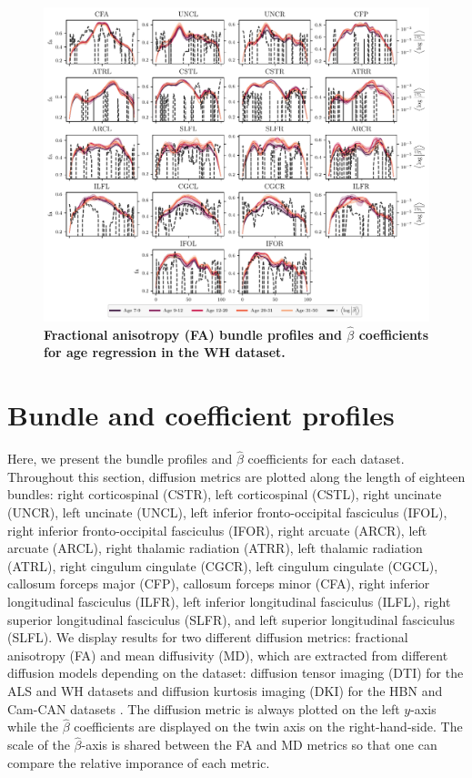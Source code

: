 \documentclass[10pt,%
               aps,%
               prl,%
               reprint,%
               superscriptaddress,%
               preprintnumbers,%
               linenumbers,%
               amsmath,%
               floatfix]{revtex4-2}
\begin{document}
\begin{figure}
    \includegraphics[width=\textwidth]{wh_coefs_profiles_fa.pdf}
    \caption{%
        {%
            \bf Fractional anisotropy (FA) bundle profiles and $\hat{\beta}$
            coefficients for age regression in the WH dataset.
        }
        \label{fig:wh-bp:fa}
    }
\end{figure}

\section{Bundle and coefficient profiles}
\label{sec:bundle-profiles}

Here, we present the bundle profiles and $\hat{\beta}$ coefficients
for each dataset. Throughout this section, diffusion metrics are plotted
along the length of eighteen bundles:
right corticospinal (CSTR),
left corticospinal (CSTL),
right uncinate (UNCR),
left uncinate (UNCL),
left inferior fronto-occipital fasciculus (IFOL),
right inferior fronto-occipital fasciculus (IFOR),
right arcuate (ARCR),
left arcuate (ARCL),
right thalamic radiation (ATRR),
left thalamic radiation (ATRL),
right cingulum cingulate (CGCR),
left cingulum cingulate (CGCL),
callosum forceps major (CFP),
callosum forceps minor (CFA),
right inferior longitudinal fasciculus (ILFR),
left inferior longitudinal fasciculus (ILFL),
right superior longitudinal fasciculus (SLFR),
and left superior longitudinal fasciculus (SLFL).
We display results for two different diffusion metrics: fractional anisotropy
(FA) and mean diffusivity (MD), which are extracted from different diffusion
models depending on the dataset: diffusion tensor imaging (DTI) for the ALS
and WH datasets and diffusion kurtosis imaging (DKI) for the HBN and Cam-CAN
datasets \cite{jensen2005diffusion}. The diffusion metric is always plotted
on the left $y$-axis while the $\hat{\beta}$ coefficients are displayed on
the twin axis on the right-hand-side. The scale of the $\hat{\beta}$-axis is
shared between the FA and MD metrics so that one can compare the relative
imporance of each metric.
\end{document}
